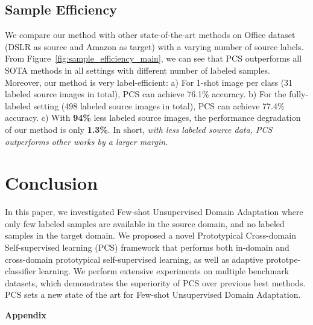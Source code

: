 \documentclass[final]{cvpr}
\begin{document}
\subsection{Sample Efficiency}

We compare our method with other state-of-the-art methods on Office dataset (DSLR as source and Amazon as target) with a varying number of source labels. From Figure~\ref{fig:sample_efficiency_main}, we can see that PCS outperforms all SOTA methods in all settings with different number of labeled samples. Moreover, our method is very label-efficient: 
a) For 1-shot image per class (31 labeled source images in total), PCS can achieve 76.1\% accuracy.
b) For the fully-labeled setting (498 labeled source images in total), PCS can achieve 77.4\% accuracy.
c) With \textbf{94\%} less labeled source images, the performance degradation of our method is only \textbf{1.3\%}. In short, \textit{with less labeled source data, PCS outperforms other works by a larger margin.}

\section{Conclusion}
In this paper, we investigated Few-shot Unsupervised Domain Adaptation where only few labeled samples are available in the source domain, and no labeled samples in the target domain. 
We proposed a novel Prototypical Cross-domain Self-supervised learning (PCS) framework that performs both in-domain and cross-domain prototypical self-supervised learning, as well as adaptive prototpe-classifier learning. 
We perform extensive experiments on multiple benchmark datasets, which demonstrates the superiority of PCS over previous best methods. PCS sets a new state of the art for Few-shot Unsupervised Domain Adaptation. 


{\small


}

\clearpage
\appendix
\noindent\textbf{\Large Appendix}
\end{document}
